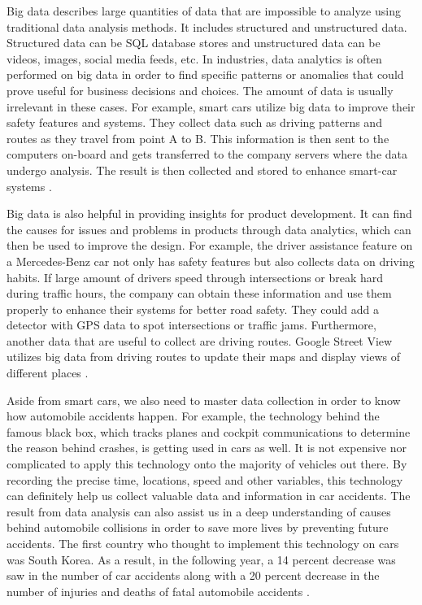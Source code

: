 Big data describes large quantities of data that are impossible to analyze using traditional data analysis methods. It includes structured and unstructured data. Structured data can be SQL database stores and unstructured data can be videos, images, social media feeds, etc. In industries, data analytics is often performed on big data in order to find specific patterns or anomalies that could prove useful for business decisions and choices. The amount of data is usually irrelevant in these cases. For example, smart cars utilize big data to improve their safety features and systems. They collect data such as driving patterns and routes as they travel from point A to B. This information is then sent to the computers on-board and gets transferred to the company servers where the data undergo analysis. The result is then collected and stored to enhance smart-car systems \cite{Walker2017safety}.

Big data is also helpful in providing insights for product development. It can find the causes for issues and problems in products through data analytics, which can then be used to improve the design. For example, the driver assistance feature on a Mercedes-Benz car not only has safety features but also collects data on driving habits. If large amount of drivers speed through intersections or break hard during traffic hours, the company can obtain these information and use them properly to enhance their systems for better road safety. They could add a detector with GPS data to spot intersections or traffic jams. Furthermore, another data that are useful to collect are driving routes. Google Street View utilizes big data from driving routes to update their maps and display views of different places \cite{Walker2017safety}.

Aside from smart cars, we also need to master data collection in order to know how automobile accidents happen. For example, the technology behind the famous black box, which tracks planes and cockpit communications to determine the reason behind crashes, is getting used in cars as well. It is not expensive nor complicated to apply this technology onto the majority of vehicles out there. By recording the precise time, locations, speed and other variables, this technology can definitely help us collect valuable data and information in car accidents. The result from data analysis can also assist us in a deep understanding of causes behind automobile collisions in order to save more lives by preventing future accidents. The first country who thought to implement this technology on cars was South Korea. As a result, in the following year, a 14 percent decrease was saw in the number of car accidents along with a 20 percent decrease in the number of injuries and deaths of fatal automobile accidents \cite{Mills2017safety}.

